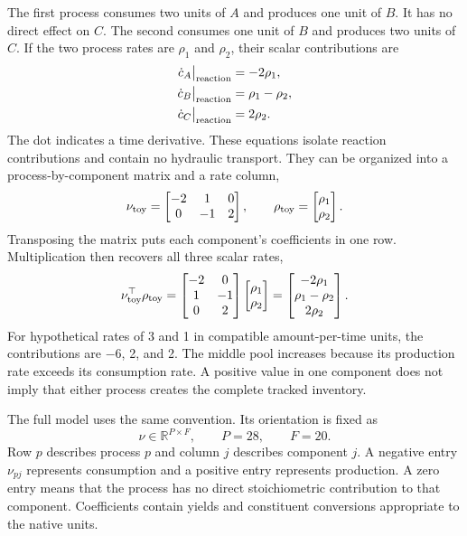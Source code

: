 The first process consumes two units of $A$ and produces one unit of $B$. It has no direct effect on $C$. The second consumes one unit of $B$ and produces two units of $C$. If the two process rates are $\rho_1$ and $\rho_2$, their scalar contributions are
\[
\begin{aligned}
\dot c_A\big|_{\rm reaction}&=-2\rho_1,\\
\dot c_B\big|_{\rm reaction}&=\rho_1-\rho_2,\\
\dot c_C\big|_{\rm reaction}&=2\rho_2.
\end{aligned}
\]
The dot indicates a time derivative. These equations isolate reaction contributions and contain no hydraulic transport. They can be organized into a process-by-component matrix and a rate column,
\[
\nu_{\rm toy}=\begin{bmatrix}-2&1&0\\0&-1&2\end{bmatrix},\qquad
\rho_{\rm toy}=\begin{bmatrix}\rho_1\\\rho_2\end{bmatrix}.
\]
Transposing the matrix puts each component's coefficients in one row. Multiplication then recovers all three scalar rates,
\[
\nu_{\rm toy}^\top\rho_{\rm toy}
=\begin{bmatrix}-2&0\\1&-1\\0&2\end{bmatrix}
\begin{bmatrix}\rho_1\\\rho_2\end{bmatrix}
=\begin{bmatrix}-2\rho_1\\\rho_1-\rho_2\\2\rho_2\end{bmatrix}.
\]
For hypothetical rates of 3 and 1 in compatible amount-per-time units, the contributions are $-6$, 2, and 2. The middle pool increases because its production rate exceeds its consumption rate. A positive value in one component does not imply that either process creates the complete tracked inventory.

The full model uses the same convention. Its orientation is fixed as
\begin{equation}
\nu\in\mathbb{R}^{P\times F},\qquad P=28,\qquad F=20.
\label{eq:petersen_orientation}
\end{equation}
Row $p$ describes process $p$ and column $j$ describes component $j$. A negative entry $\nu_{pj}$ represents consumption and a positive entry represents production. A zero entry means that the process has no direct stoichiometric contribution to that component. Coefficients contain yields and constituent conversions appropriate to the native units.

